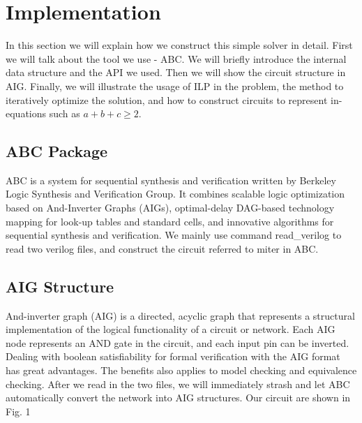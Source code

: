 \section{Implementation}
In this section we will explain how we construct this simple solver in detail. First we will talk about the tool we use - ABC. We will briefly introduce the internal data structure and the API we used. Then we will show the circuit structure in AIG. Finally, we will illustrate the usage of ILP in the problem, the method to iteratively optimize the solution, and how to construct circuits to represent in-equations such as $a+b+c \geq 2$.
\subsection{ABC Package}
ABC is a system for sequential synthesis and verification written by Berkeley Logic Synthesis and Verification Group. It combines scalable logic optimization based on And-Inverter Graphs (AIGs), optimal-delay DAG-based technology mapping for look-up tables and standard cells, and innovative algorithms for sequential synthesis and verification.
We mainly use command read\_verilog to read two verilog files, and construct the circuit referred to miter in ABC.

\subsection{AIG Structure}
And-inverter graph (AIG) is a directed, acyclic graph that represents a structural implementation of the logical functionality of a circuit or network.
Each AIG node represents an AND gate in the circuit, and each input pin can be inverted. Dealing with boolean satisfiability for formal verification with the AIG format has great advantages. The benefits also applies to model checking and equivalence checking.
After we read in the two files, we will immediately strash and let ABC automatically convert the network into AIG structures. Our circuit are shown in Fig. 1
